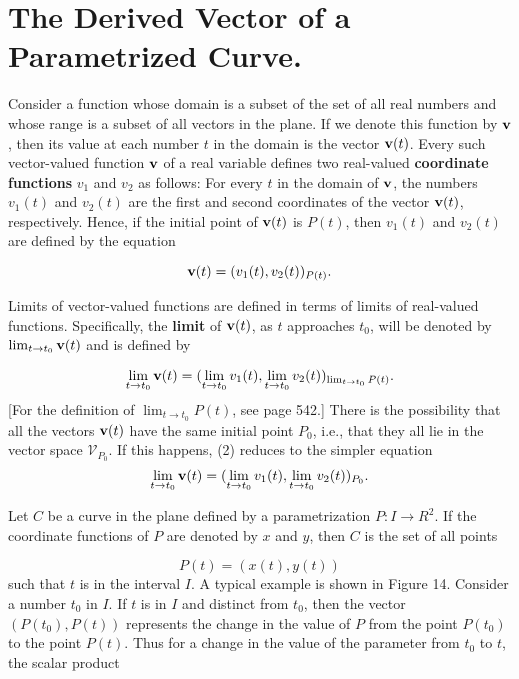\section{The Derived Vector of a Parametrized Curve.} Consider a function whose domain is a subset of the set of all real numbers and whose range is a subset of all vectors in the plane. If we denote this function by $\mbox{\bf{v}}$, then its value at each number $t$ in the domain is the vector $\mbox{\bf{v}}(t)$. Every such vector-valued function $\mbox{\bf{v}}$ of a real variable defines two real-valued \textbf{coordinate functions} $v_1$ and $v_2$ as follows: For every $t$ in the domain of $\mbox{\bf{v}}$, the numbers $v_1(t)$ and $v_2(t)$ are the first and second coordinates of the vector $\mbox{\bf{v}}(t)$, respectively. Hence, if the initial point of $\mbox{\bf{v}}(t)$ is $P(t)$, then $v_1(t)$ and $v_2(t)$ are defined by the equation

\begin{equation}
\mbox{\bf{v}}(t) = (v_1(t), v_2(t))_{P(t)}. 
\label{eq10.4.1}
\end{equation}


Limits of vector-valued functions are defined in terms of limits of real-valued functions. Specifically, the \textbf{limit} of $\mbox{\bf{v}}(t)$, as $t$ approaches $t_0$, will be denoted by $\lim_{t \rightarrow t_0} \mbox{\bf{v}}(t)$ and is defined by

\begin{equation}
\lim_{t \rightarrow t_0} \mbox{\bf{v}}(t) = (\lim_{t \rightarrow t_0} v_1(t), \lim_{t \rightarrow t_0} v_2(t)) _{\lim_{t \rightarrow t_0} P(t)} .  
\label{eq10.4.2}
\end{equation}
[For the definition of $\lim_{t \rightarrow t_0} P(t)$, see page 542.] There is the possibility that all the vectors $\mbox{\bf{v}}(t)$ have the same initial point $P_0$, i.e., that they all lie in the vector space $\mathcal{V}_{P_0}$. If this happens, (2) reduces to the simpler equation 
$$
\lim_{t \rightarrow t_0} \mbox{\bf{v}}(t) = (\lim_{t \rightarrow t_0} v_1(t), \lim_{t \rightarrow t_0} v_2(t))_{P_0} .
$$

Let $C$ be a curve in the plane defined by a parametrization $P: I \rightarrow R^2$. If the coordinate functions of $P$ are denoted by $x$ and $y$, then $C$ is the set of all points

$$
P(t)= (x(t), y(t)) 
$$
such that $t$ is in the interval $I$. A typical example is shown in Figure 14. Consider a number $t_0$ in $I$. If $t$ is in $I$ and distinct from $t_0$, then the vector $(P(t_0), P(t))$ represents the change in the value of $P$ from the point $P(t_0)$ to
the point $P(t)$. Thus for a change in the value of the parameter from $t_0$ to $t$, the scalar product

